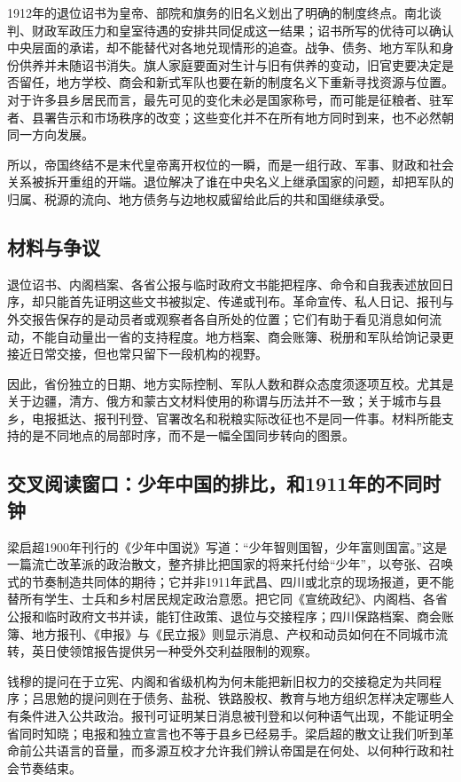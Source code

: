 1912年的退位诏书为皇帝、部院和旗务的旧名义划出了明确的制度终点。南北谈判、财政军政压力和皇室待遇的安排共同促成这一结果；诏书所写的优待可以确认中央层面的承诺，却不能替代对各地兑现情形的追查。战争、债务、地方军队和身份供养并未随诏书消失。旗人家庭要面对生计与旧有供养的变动，旧官吏要决定是否留任，地方学校、商会和新式军队也要在新的制度名义下重新寻找资源与位置。对于许多县乡居民而言，最先可见的变化未必是国家称号，而可能是征粮者、驻军者、县署告示和市场秩序的改变；这些变化并不在所有地方同时到来，也不必然朝同一方向发展。

所以，帝国终结不是末代皇帝离开权位的一瞬，而是一组行政、军事、财政和社会关系被拆开重组的开端。退位解决了谁在中央名义上继承国家的问题，却把军队的归属、税源的流向、地方债务与边地权威留给此后的共和国继续承受。

\subsection{材料与争议}

退位诏书、内阁档案、各省公报与临时政府文书能把程序、命令和自我表述放回日序，却只能首先证明这些文书被拟定、传递或刊布。革命宣传、私人日记、报刊与外交报告保存的是动员者或观察者各自所处的位置；它们有助于看见消息如何流动，不能自动量出一省的支持程度。地方档案、商会账簿、税册和军队给饷记录更接近日常交接，但也常只留下一段机构的视野。

因此，省份独立的日期、地方实际控制、军队人数和群众态度须逐项互校。尤其是关于边疆，清方、俄方和蒙古文材料使用的称谓与历法并不一致；关于城市与县乡，电报抵达、报刊刊登、官署改名和税粮实际改征也不是同一件事。材料所能支持的是不同地点的局部时序，而不是一幅全国同步转向的图景。

\subsection{交叉阅读窗口：少年中国的排比，和1911年的不同时钟}

梁启超1900年刊行的《少年中国说》写道：“少年智则国智，少年富则国富。”这是一篇流亡改革派的政治散文，整齐排比把国家的将来托付给“少年”，以夸张、召唤式的节奏制造共同体的期待；它并非1911年武昌、四川或北京的现场报道，更不能替所有学生、士兵和乡村居民规定政治意愿。把它同《宣统政纪》、内阁档、各省公报和临时政府文书并读，能钉住政策、退位与交接程序；四川保路档案、商会账簿、地方报刊、《申报》与《民立报》则显示消息、产权和动员如何在不同城市流转，英日使领馆报告提供另一种受外交利益限制的观察。

钱穆的提问在于立宪、内阁和省级机构为何未能把新旧权力的交接稳定为共同程序；吕思勉的提问则在于债务、盐税、铁路股权、教育与地方组织怎样决定哪些人有条件进入公共政治。报刊可证明某日消息被刊登和以何种语气出现，不能证明全省同时知晓；电报和独立宣言也不等于县乡已经易手。梁启超的散文让我们听到革命前公共语言的音量，而多源互校才允许我们辨认帝国是在何处、以何种行政和社会节奏结束。
